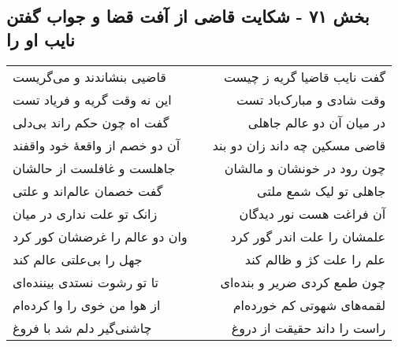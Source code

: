 \begin{center}
\section*{بخش ۷۱ - شکایت قاضی از آفت قضا و جواب گفتن نایب او را}
\label{sec:sh071}
\begin{longtable}{l p{0.5cm} r}
قاضیی بنشاندند و می‌گریست
&&
گفت نایب قاضیا گریه ز چیست
\\
این نه وقت گریه و فریاد تست
&&
وقت شادی و مبارک‌باد تست
\\
گفت اه چون حکم راند بی‌دلی
&&
در میان آن دو عالم جاهلی
\\
آن دو خصم از واقعهٔ خود واقفند
&&
قاضی مسکین چه داند زان دو بند
\\
جاهلست و غافلست از حالشان
&&
چون رود در خونشان و مالشان
\\
گفت خصمان عالم‌اند و علتی
&&
جاهلی تو لیک شمع ملتی
\\
زانک تو علت نداری در میان
&&
آن فراغت هست نور دیدگان
\\
وان دو عالم را غرضشان کور کرد
&&
علمشان را علت اندر گور کرد
\\
جهل را بی‌علتی عالم کند
&&
علم را علت کژ و ظالم کند
\\
تا تو رشوت نستدی بیننده‌ای
&&
چون طمع کردی ضریر و بنده‌ای
\\
از هوا من خوی را وا کرده‌ام
&&
لقمه‌های شهوتی کم خورده‌ام
\\
چاشنی‌گیر دلم شد با فروغ
&&
راست را داند حقیقت از دروغ
\\
\end{longtable}
\end{center}
